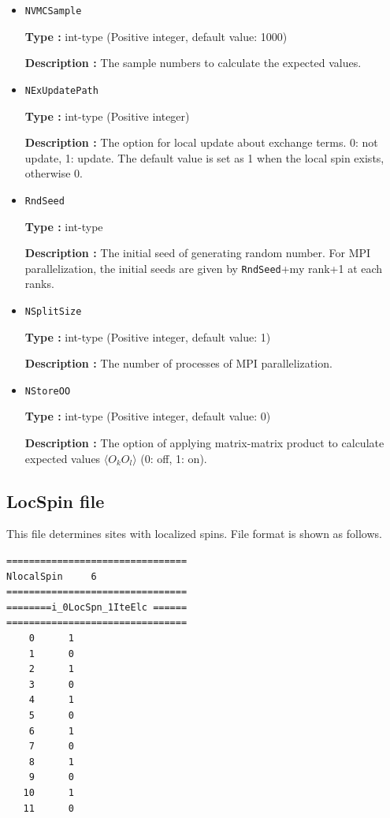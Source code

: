 \begin{itemize}
\item \verb|NVMCSample|

{\bf Type :} int-type (Positive integer, default value: 1000)

{\bf Description :} The sample numbers to calculate the expected values.

\item \verb|NExUpdatePath|

{\bf Type :} int-type (Positive integer)

{\bf Description :}  The option for local update about exchange terms. 0: not update, 1: update. The default value is set as 1 when the local spin exists, otherwise 0.

\item \verb|RndSeed|

{\bf Type :} int-type 

{\bf Description :} The initial seed of generating random number. For MPI parallelization, the initial seeds are given by \verb|RndSeed|+my rank+1 at each ranks. 

 \item \verb|NSplitSize|

{\bf Type :} int-type (Positive integer, default value: 1)

{\bf Description :} The number of processes of MPI parallelization.

\item \verb|NStoreOO|

{\bf Type :} int-type (Positive integer, default value: 0)

{\bf Description :} The option of applying matrix-matrix product to calculate expected values $\langle O_k O_l \rangle$ (0: off, 1: on).
 
 \end{itemize}


\newpage
\subsection{LocSpin file}
\label{Subsec:locspn}
This file determines sites with localized spins. File format is shown as follows.\\
\begin{minipage}{10cm}
\begin{screen}
\begin{verbatim}
================================ 
NlocalSpin     6  
================================ 
========i_0LocSpn_1IteElc ====== 
================================ 
    0      1
    1      0
    2      1
    3      0
    4      1
    5      0
    6      1
    7      0
    8      1
    9      0
   10      1
   11      0
\end{verbatim}
\end{screen}
\end{minipage}


